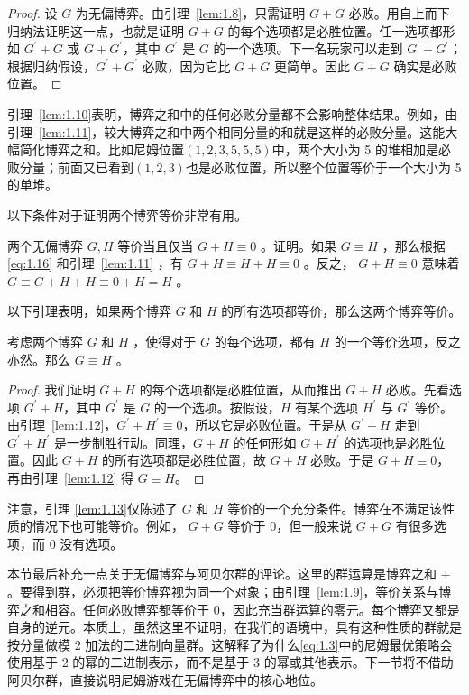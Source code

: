 \begin{proof}设 \(G\) 为无偏博弈。由引理~\ref{lem:1.8}，只需证明 \(G+G\) 必败。用自上而下归纳法证明这一点，也就是证明 \(G+G\) 的每个选项都是必胜位置。任一选项都形如 \({G}^{\prime}+G\) 或 \(G+{G}^{\prime}\)，其中 \({G}^{\prime}\) 是 \(G\) 的一个选项。下一名玩家可以走到 \({G}^{\prime}+{G}^{\prime}\)；根据归纳假设，\({G}^{\prime}+{G}^{\prime}\) 必败，因为它比 \(G+G\) 更简单。因此 \(G+G\) 确实是必败位置。\end{proof}

引理~\ref{lem:1.10}表明，博弈之和中的任何必败分量都不会影响整体结果。例如，由引理~\ref{lem:1.11}，较大博弈之和中两个相同分量的和就是这样的必败分量。这能大幅简化博弈之和。比如尼姆位置$(1,2,3,5,5,5)$中，两个大小为 5 的堆相加是必败分量；前面又已看到$(1,2,3)$也是必败位置，所以整个位置等价于一个大小为 5 的单堆。

以下条件对于证明两个博弈等价非常有用。
\begin{lemma}\label{lem:1.12}
两个无偏博弈 \(G,H\) 等价当且仅当 \(G + H \equiv  0\) 。证明。如果 \(G \equiv  H\) ，那么根据 \eqref{eq:1.16} 和引理~\ref{lem:1.11} ，有 \(G + H \equiv  H + H \equiv  0\) 。反之， \(G + H \equiv  0\) 意味着 \(G \equiv  G + H + H \equiv  0 + H = H\) 。
\end{lemma}
以下引理表明，如果两个博弈 \(G\) 和 \(H\) 的所有选项都等价，那么这两个博弈等价。
\begin{lemma}\label{lem:1.13}考虑两个博弈 \(G\) 和 \(H\) ，使得对于 \(G\) 的每个选项，都有 \(H\) 的一个等价选项，反之亦然。那么 \(G \equiv  H\) 。\end{lemma}

\begin{proof}
我们证明 \(G+H\) 的每个选项都是必胜位置，从而推出 \(G+H\) 必败。先看选项 \({G}^{\prime}+H\)，其中 \({G}^{\prime}\) 是 \(G\) 的一个选项。按假设，\(H\) 有某个选项 \({H}^{\prime}\) 与 \({G}^{\prime}\) 等价。由引理~\ref{lem:1.12}，\({G}^{\prime}+{H}^{\prime}\equiv 0\)，所以它是必败位置。于是从 \({G}^{\prime}+H\) 走到 \({G}^{\prime}+{H}^{\prime}\) 是一步制胜行动。同理，\(G+H\) 的任何形如 \(G+{H}^{\prime}\) 的选项也是必胜位置。因此 \(G+H\) 的所有选项都是必胜位置，故 \(G+H\) 必败。于是 \(G+H\equiv0\)，再由引理~\ref{lem:1.12} 得 \(G\equiv H\)。\end{proof}

注意，引理 \ref{lem:1.13}仅陈述了 \(G\) 和 \(H\) 等价的一个充分条件。博弈在不满足该性质的情况下也可能等价。例如， \(G + G\) 等价于 0，但一般来说 \(G + G\) 有很多选项，而 0 没有选项。

本节最后补充一点关于无偏博弈与阿贝尔群的评论。这里的群运算是博弈之和 \(+\)。要得到群，必须把等价博弈视为同一个对象；由引理~\ref{lem:1.9}，等价关系与博弈之和相容。任何必败博弈都等价于 0，因此充当群运算的零元。每个博弈又都是自身的逆元。本质上，虽然这里不证明，在我们的语境中，具有这种性质的群就是按分量做模 2 加法的二进制向量群。这解释了为什么\eqref{eq:1.3}中的尼姆最优策略会使用基于 2 的幂的二进制表示，而不是基于 3 的幂或其他表示。下一节将不借助阿贝尔群，直接说明尼姆游戏在无偏博弈中的核心地位。

